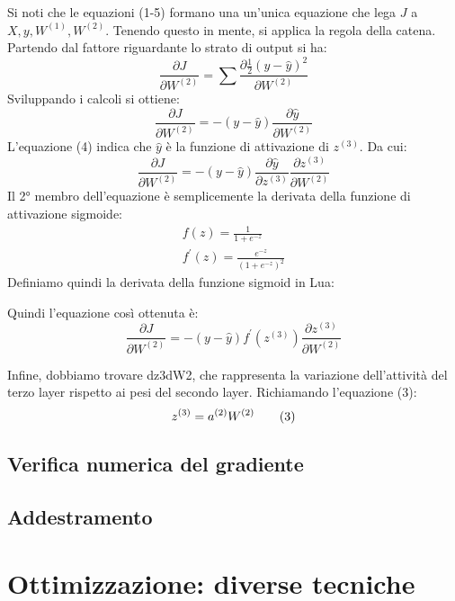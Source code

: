 Si noti che le equazioni (1-5) formano una un'unica equazione che lega $J$ a $X, y, W^{(1)}, W^{(2)}$. Tenendo questo in mente, si applica la regola della catena. \\ 
Partendo dal fattore riguardante lo strato di output si ha: 
$$
\frac{\partial J}{\partial W^{(2)}} = \sum \frac{\partial \frac{1}{2}(y-\hat{y})^2}{\partial W^{(2)}}
$$
Sviluppando i calcoli si ottiene: 
$$
\frac{\partial J}{\partial W^{(2)}} = -(y-\hat{y}) \frac{\partial \hat{y}}{\partial W^{(2)}}
$$
L'equazione (4) indica che $\hat{y}$ è la funzione di attivazione di $z^{(3)}$. Da cui: 
$$
\frac{\partial J}{\partial W^{(2)}} = 
-(y-\hat{y})
\frac{\partial \hat{y}}{\partial z^{(3)}}  
\frac{\partial z^{(3)}}{\partial W^{(2)}}
$$
Il 2° membro dell'equazione è semplicemente la derivata della funzione di attivazione sigmoide: 
\begin{align*}
f(z) = \frac{1}{1+e^{-z}}\\
f^\prime(z) = \frac{e^{-z}}{(1+e^{-z})^2}
\end{align*}
Definiamo quindi la derivata della funzione sigmoid in Lua: 

Quindi l'equazione così ottenuta è: 
$$
\frac{\partial J}{\partial W^{(2)}}= 
-(y-\hat{y}) f^\prime(z^{(3)}) \frac{\partial z^{(3)}}{\partial W^{(2)}}
$$
 
Infine, dobbiamo trovare dz3dW2, che rappresenta la variazione dell'attività del terzo layer rispetto ai pesi del secondo layer. Richiamando l'equazione (3): 
$$
z^{(3)} = a^{(2)}W^{(2)} \tag{3}\\
$$





\subsection{Verifica numerica del gradiente}
\subsection{Addestramento}


\section{Ottimizzazione: diverse tecniche}


